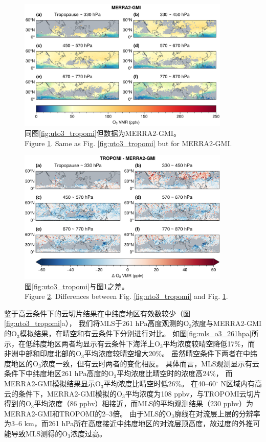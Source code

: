 \begin{figure}[H]
    \centering
    \includegraphics[width=0.9\textwidth]{./figures/uto3_merra2-gmi.png}
    \caption{
    同图\ref{fig:uto3_tropomi}但数据为MERRA2-GMI。 \\
    Figure \ref{fig:uto3_merra2}. Same as Fig. \ref{fig:uto3_tropomi} but for MERRA2-GMI.
    }
    \label{fig:uto3_merra2}
\end{figure}


\begin{figure}[H]
    \centering
    \includegraphics[width=0.9\textwidth]{./figures/uto3_delta.png}
    \caption{
    图\ref{fig:uto3_tropomi}与图\ref{fig:uto3_merra2}之差。 \\
    Figure \ref{fig:uto3_delta}. Differences between Fig. \ref{fig:uto3_tropomi} and Fig. \ref{fig:uto3_merra2}.
    }
    \label{fig:uto3_delta}
\end{figure}


鉴于高云条件下的云切片结果在中纬度地区有效数较少（图\ref{fig:uto3_tropomi}a），
我们将MLS于261 hPa高度观测的O$_3$浓度与MERRA2-GMI的O$_3$模拟结果，在晴空和有云条件下分别进行对比。
如图\ref{fig:mls_o3_261hpa}所示，在低纬度地区两者均显示有云条件下海洋上O$_3$平均浓度较晴空降低17\%，而非洲中部和印度北部的O$_3$平均浓度较晴空增大20\%。
虽然晴空条件下两者在中纬度地区的O$_3$浓度一致，但有云时两者的变化相反。
具体而言，MLS观测显示有云条件下中纬度地区261 hPa高度的O$_3$平均浓度比晴空时的浓度高24\%，
而MERRA2-GMI模拟结果显示O$_3$平均浓度比晴空时低26\%。
在40--60$^{\circ}$ N区域内有高云的条件下，MERRA2-GMI模拟的O$_3$平均浓度为108 ppbv，与TROPOMI云切片得到的O$_3$平均浓度（86 ppbv）相接近，而MLS的平均观测结果（230 ppbv）为MERRA2-GMI和TROPOMI的2--3倍。
由于MLS的O$_3$廓线在对流层上层的分辨率为3--6 km，而261 hPa所在高度接近中纬度地区的对流层顶高度，故过度的外推可能导致MLS测得的O$_3$浓度过高\citep{Schoeberl.2007}。


